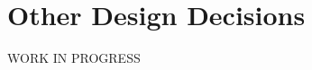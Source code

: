 \documentclass[../../DD.tex]{subfiles}
\begin{document}
\section{Other Design Decisions}
	WORK IN PROGRESS
	
\end{document}
